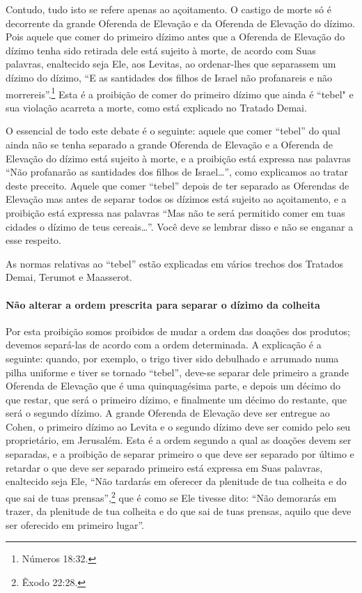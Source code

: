 Contudo, tudo isto se refere apenas ao açoitamento. O castigo de morte
só é decorrente da grande Oferenda de Elevação e da Oferenda de
Elevação do dízimo. Pois aquele que comer do primeiro dízimo antes que
a Oferenda de Elevação do dízimo tenha sido retirada dele está sujeito
à morte, de acordo com Suas palavras, enaltecido seja Ele, aos Levitas,
ao ordenar-lhes que separassem um dízimo do dízimo, ``E as santidades
dos filhos de Israel não profanareis e não morrereis''.\footnote{Números 18:32.}
Esta é a proibição de comer do primeiro dízimo que ainda é ``tebel" e
sua violação acarreta a morte, como está explicado no Tratado Demai.

O essencial de todo este debate é o seguinte: aquele que comer
``tebel'' do qual ainda não se tenha separado a grande Oferenda de
Elevação e a Oferenda de Elevação do dízimo está sujeito à morte, e a
proibição está expressa nas palavras ``Não profanarão as santidades dos
filhos de Israel\ldots{}'', como explicamos ao tratar deste preceito. Aquele
que comer ``tebel'' depois de ter separado as Oferendas de Elevação mas
antes de separar todos os dízimos está sujeito ao açoitamento, e a
proibição está expressa nas palavras ``Mas não te será permitido comer
em tuas cidades o dízimo de teus cereais\ldots{}''. Você deve se lembrar
disso e não se enganar a esse respeito.

As normas relativas ao ``tebel'' estão explicadas em vários trechos dos
Tratados Demai, Terumot e Maasserot.

\paragraph{Não alterar a ordem prescrita para separar o dízimo da colheita}

Por esta proibição somos proibidos de mudar a ordem das doações dos
produtos; devemos separá-las de acordo com a ordem determinada. A
explicação é a seguinte: quando, por exemplo, o trigo tiver sido
debulhado e arrumado numa pilha uniforme e tiver se tornado ``tebel'',
deve-se separar dele primeiro a grande Oferenda de Elevação que é uma
quinquagésima parte, e depois um décimo do que restar, que será o
primeiro dízimo, e finalmente um décimo do restante, que será o segundo
dízimo. A grande Oferenda de Elevação deve ser entregue ao Cohen, o
primeiro dízimo ao Levita e o segundo dízimo deve ser comido pelo seu
proprietário, em Jerusalém. Esta é a ordem segundo a qual as doações
devem ser separadas, e a proibição de separar primeiro o que deve ser
separado por último e retardar o que deve ser separado primeiro está
expressa em Suas palavras, enaltecido seja Ele, ``Não tardarás em
oferecer da plenitude de tua colheita e do que sai de tuas prensas'',\footnote{Êxodo 22:28.} que é como se Ele tivesse dito: ``Não demorarás em
trazer, da plenitude de tua colheita e do que sai de tuas prensas, aquilo que deve ser oferecido em primeiro lugar''.

